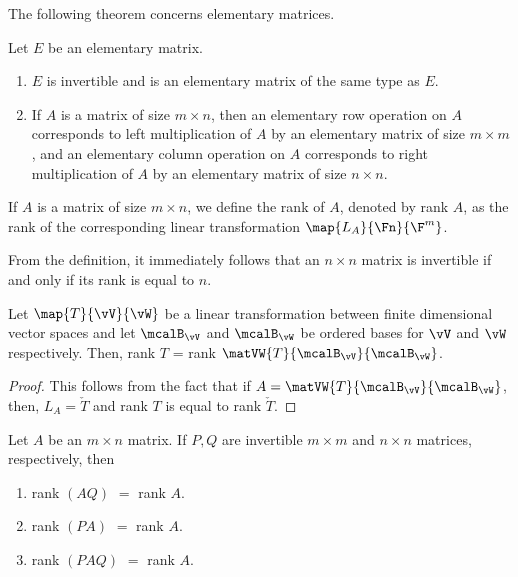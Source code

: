 The following theorem concerns elementary matrices. 
\begin{Theorem}
    Let $E$ be an elementary matrix. 
    \begin{enumerate}
	\item
	    $E$ is invertible and is an elementary matrix of the same type as $E$.
	\item
	    If $A$ is a matrix of size $m\times n$, then an elementary row operation on $A$
	    corresponds to left multiplication of $A$ by an elementary matrix of size $m \times m$,
	    and an elementary column operation on $A$ corresponds to right multiplication of $A$ by
	    an elementary matrix of size $n \times n$.
    \end{enumerate}
\end{Theorem}
\begin{Definition}
    If $A$ is a matrix of size $m\times n$, we define the rank of $A$, denoted by rank $A$, as the
    rank of the corresponding linear transformation $\map{L_{A}}{\Fn}{\F^m}$.
\end{Definition}
\begin{Remark}
    From the definition, it immediately follows that an $n\times n$ matrix is invertible if and only
    if its rank is equal to $n$.

\end{Remark}
\begin{Proposition}
    Let $\map{T}{\vV}{\vW}$ be a linear transformation between finite dimensional vector spaces and
    let $\mcalB_{\vV}$ and $\mcalB_{\vW}$ be ordered bases for $\vV$ and $\vW$ respectively. Then,
    rank $T$ = rank $\matVW{T}{\mcalB_{\vV}}{\mcalB_{\vW}}$.
\end{Proposition}
\begin{proof}
    This follows from the fact that if $A = \matVW{T}{\mcalB_{\vV}}{\mcalB_{\vW}}$, then,
    $L_A = \check{T}$ and rank $T$ is equal to rank $\check{T}$.
\end{proof}
\begin{Proposition}
    Let $A$ be an $m\times n$ matrix. If $P,Q$ are invertible $m\times m$ and $n\times n$ matrices,
    respectively, then
    \begin{enumerate}
	\item
	    rank $(AQ)$ $ = $ rank $A$.
	\item 
	    rank $(PA)$ $ = $ rank $A$.
	\item
	    rank $(PAQ)$ $ = $ rank $A$.
    \end{enumerate}
\end{Proposition}
